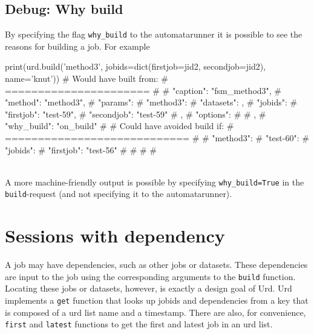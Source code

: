 \subsection{Debug:  Why build}

By specifying the flag \texttt{why\_build} to the automatarunner it is
possible to see the reasons for building a job.  For example
\\
\begin{python}
  print(urd.build('method3', jobids=dict(firstjob=jid2, secondjob=jid2), name='knut'))
# Would have built from:
# ======================
# {
#     "caption": "fsm_method3", 
#     "method": "method3", 
#     "params": {
#         "method3": {
#             "datasets": {}, 
#             "jobids": {
#                 "firstjob": "test-59", 
#                 "secondjob": "test-59"
#             }, 
#             "options": {}
#         }
#     }, 
#     "why_build": "on_build"
# }
# Could have avoided build if:
# ============================
# {
#     "method3": {
#         "test-60": {
#             "jobids": {
#                 "firstjob": "test-56"
#             }
#         }
#     }
# }
\end{python}
\\
A more machine-friendly output is possible by specifying
\texttt{why\_build=True} in the \texttt{build}-request (and not
specifying it to the automatarunner).



\newpage
\section{Sessions with dependency}

A job may have dependencies, such as other jobs or datasets.  These
dependencies are input to the job using the corresponding arguments to
the \texttt{build} function.  Locating these jobs or datasets,
however, is exactly a design goal of Urd.  Urd implements a
\texttt{get} function that looks up jobids and dependencies from a key
that is composed of a urd list name and a timestamp.  There are also,
for convenience, \texttt{first} and \texttt{latest} functions to get
the first and latest job in an urd list.

